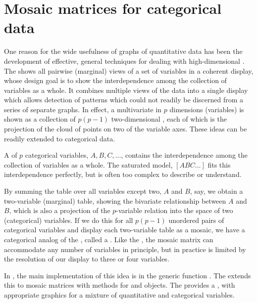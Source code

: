 \documentclass[10pt,krantz2]{krantz}\usepackage[]{graphicx}\usepackage[]{color}
\begin{document}
\section{Mosaic matrices for categorical data}\label{sec:mosmat}

One reason for the wide usefulness of graphs of quantitative data
has been the
development of effective, general techniques for dealing with high-dimensional \Dsets.
The 
shows all pairwise (marginal) views of a set of variables
in a coherent display, whose design goal is to show the interdependence
among the collection of variables as a whole.
It combines multiple views of the data
into a single display which allows detection of patterns which could
not readily be discerned from a series of separate graphs.
In effect, a multivariate \Dset in $p$ dimensions (variables) is shown as
a collection of $p (p-1)$ two-dimensional \scats, each of which is
the projection of the cloud of points on two of the variable axes.
These ideas can be readily extended to categorical data.

A \mway \ctab of $p$ categorical variables,
$A, B, C,\dots$, contains the interdependence among the collection
of variables as a whole.  The saturated \loglin model, $[A B C\dots]$
fits this interdependence perfectly, but is often too complex to describe
or understand.

By summing the table over all variables except two,
$A$ and $B$, say, we obtain a two-variable (marginal) table, showing the
bivariate relationship between $A$ and $B$, which is also a projection
of the $p$-variable relation into the space of two (categorical) variables.
If we do this for all $p (p-1)$ unordered pairs of categorical variables
and display each two-variable table as a mosaic,  we have a categorical
analog of the \scatmat, called a
.
Like the \scatmat, the mosaic matrix can accommodate any number of
variables in principle, but in practice is limited by the resolution
of our display to three or four variables.

In \R, the main implementation of this idea is in the generic function
.  The  extends this to
mosaic matrices with methods
for  and  objects.
The  provides a ,
with appropriate graphics for a mixture of quantitative and categorical
variables.
\end{document}
